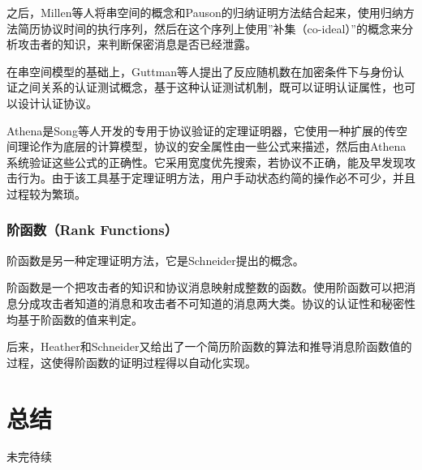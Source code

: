 \documentclass[cs4size,a4pape,UTF8]{ctexart}
\numberwithin{equation}{section}
\numberwithin{table}{section}
\numberwithin{figure}{section}
\begin{document}
之后，Millen等人将串空间的概念和Pauson的归纳证明方法结合起来，使用归纳方法简历协议时间的执行序列，然后在这个序列上使用''补集（co-ideal）''的概念来分析攻击者的知识，来判断保密消息是否已经泄露。

在串空间模型的基础上，Guttman等人提出了反应随机数在加密条件下与身份认证之间关系的认证测试概念，基于这种认证测试机制，既可以证明认证属性，也可以设计认证协议。

Athena是Song等人开发的专用于协议验证的定理证明器，它使用一种扩展的传空间理论作为底层的计算模型，协议的安全属性由一些公式来描述，然后由Athena系统验证这些公式的正确性。它采用宽度优先搜索，若协议不正确，能及早发现攻击行为。由于该工具基于定理证明方法，用户手动状态约简的操作必不可少，并且过程较为繁琐\cite{6}。

\subsubsection{阶函数（Rank Functions）}
阶函数是另一种定理证明方法，它是Schneider提出的概念。

阶函数是一个把攻击者的知识和协议消息映射成整数的函数。使用阶函数可以把消息分成攻击者知道的消息和攻击者不可知道的消息两大类。协议的认证性和秘密性均基于阶函数的值来判定。

后来，Heather和Schneider又给出了一个简历阶函数的算法和推导消息阶函数值的过程，这使得阶函数的证明过程得以自动化实现\cite{6}。


\section{总结}
未完待续

\clearpage
\end{document}
